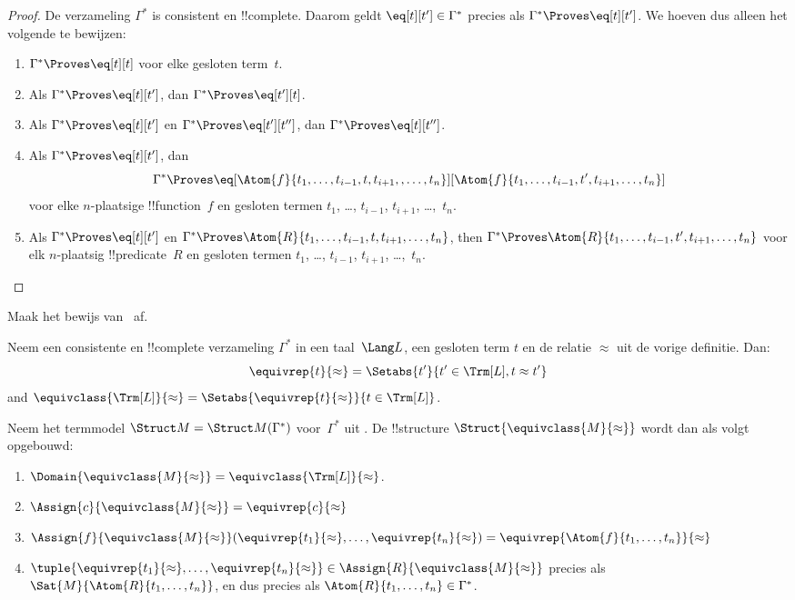 \documentclass[../../../include/open-logic-section]{subfiles}
\begin{document}
\begin{proof}
De verzameling $\Gamma^*$ is consistent en !!{complete}. Daarom geldt
$\eq[t][t'] \in \Gamma^*$ precies als
$\Gamma^* \Proves \eq[t][t']$. We hoeven dus alleen het volgende te bewijzen:
\begin{enumerate}
\item $\Gamma^* \Proves \eq[t][t]$ voor elke gesloten term~$t$.
\item Als $\Gamma^* \Proves \eq[t][t']$, dan $\Gamma^* \Proves \eq[t'][t]$.
\item Als $\Gamma^* \Proves \eq[t][t']$ en $\Gamma^* \Proves
  \eq[t'][t'']$, dan $\Gamma^* \Proves \eq[t][t'']$.
\item Als $\Gamma^* \Proves \eq[t][t']$, dan
\[
\Gamma^* \Proves
\eq[\Atom{f}{t_1,\dots,t_{i-1},t,t_{i+1},,\dots,t_n}][\Atom{f}{t_1,\dots,t_{i-1},t',t_{i+1},\dots,t_n}]
\]
voor elke $n$-plaatsige !!{function}~$f$ en gesloten termen $t_1$, \dots,
$t_{i-1}$, $t_{i+1}$, \dots,~$t_n$.
\item Als $\Gamma^* \Proves \eq[t][t']$ en
$\Gamma^* \Proves
\Atom{R}{t_1,\dots,t_{i-1},t,t_{i+1},\dots,t_n}$, then
$\Gamma^* \Proves \Atom{R}{t_1,\dots,t_{i-1},t',t_{i+1},\dots,t_n}$
voor elk $n$-plaatsig !!{predicate}~$R$ en gesloten termen $t_1$, \dots,
$t_{i-1}$, $t_{i+1}$, \dots,~$t_n$.
\end{enumerate}
\end{proof}

\begin{prob}
Maak het bewijs van~ af.
\end{prob}

\begin{defn}
Neem een consistente en !!{complete} verzameling $\Gamma^*$ in een
taal~$\Lang L$, een gesloten term $t$ en de relatie $\approx$ uit de
vorige definitie. Dan:
\[
\equivrep{t}{\approx} = \Setabs{t'}{t'\in \Trm[L], t \approx t'}
\]
and $\equivclass{\Trm[L]}{\approx} = \Setabs{\equivrep{t}{\approx}}{t \in \Trm[L]}$.
\end{defn}

\begin{defn}
Neem het termmodel $\Struct M = \Struct M(\Gamma^*)$ voor~$\Gamma^*$ uit
. De !!{structure}
$\Struct{\equivclass{M}{\approx}}$ wordt dan als volgt opgebouwd:
\begin{enumerate}
\item $\Domain{\equivclass{M}{\approx}} = \equivclass{\Trm[L]}{\approx}$.
\item $\Assign{c}{\equivclass{M}{\approx}} = \equivrep{c}{\approx}$
\item $\Assign{f}{\equivclass{M}{\approx}}(\equivrep{t_1}{\approx}, \dots,
  \equivrep{t_n}{\approx}) = \equivrep{\Atom{f}{t_1,\dots, t_n}}{\approx}$
\item $\tuple{\equivrep{t_1}{\approx}, \dots, \equivrep{t_n}{\approx}} \in
  \Assign{R}{\equivclass{M}{\approx}}$ precies als
  $\Sat{M}{\Atom{R}{t_1,\dots, t_n}}$, en dus precies als
  $\Atom{R}{t_1,\dots,
  t_n} \in \Gamma^*$.
\end{enumerate}
\end{defn}
\end{document}
